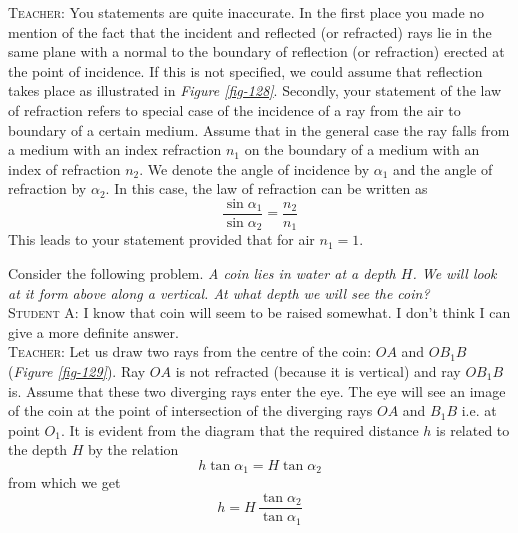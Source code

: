 \documentclass[a4paper,sfsidenotes]{tufte-book}
\begin{document}
\textsc{Teacher:} You statements are quite inaccurate. In the first place you made no mention of the fact that the incident and reflected (or refracted) rays lie in the same plane with a normal to the boundary of reflection (or refraction) erected at the point of incidence. If this is not specified, we could assume that reflection takes place as illustrated in \emph{Figure \ref{fig-128}}. Secondly, your statement of the law of refraction refers to special case of the incidence of a ray from the air to boundary of a certain medium. Assume that in the general case the ray falls from a medium with an index refraction $n_{1}$ on the boundary of a medium with an index of refraction $n_{2}$. We denote the angle of incidence by $\alpha_{1}$ and the angle of refraction by $\alpha_{2}$. In this case, the law of refraction can be written as
\begin{equation}
\frac{\sin \alpha_{1}}{\sin \alpha_{2}} = \frac{n_{2}}{n_{1}}
\label{eq-189}
\end{equation}
This leads to your statement provided that for air $n_{1}  = 1$.

Consider the following problem. \emph{A coin lies in water at a depth $H$. We will look at it form above along a vertical. At what depth we will see the coin?}
\\
\textsc{Student A:} I know that coin will seem to be raised somewhat. I don't think I can give a more definite answer. 
\\
\textsc{Teacher:} Let us draw two rays from the centre of the coin: $OA$ and $OB_{1}B$ (\emph{Figure \ref{fig-129}}). Ray $OA$ is not refracted (because it is vertical) and ray $OB_{1}B$ is. Assume that these two diverging rays enter the eye. The eye will see an image of the coin at the point of intersection of the diverging rays $OA$ and $B_{1}B$ i.e. at point $O_{1}$. It is evident from the diagram that the required distance $h$ is related to the depth $H$ by the relation
\begin{equation*}%
h \tan \alpha_{1} = H \tan \alpha_{2} 
\end{equation*}
 from which we get
\begin{equation}%
h =H \, \frac{\tan \alpha_{2}}{\tan \alpha_{1}}
\label{eq-190}
\end{equation}
\end{document}
